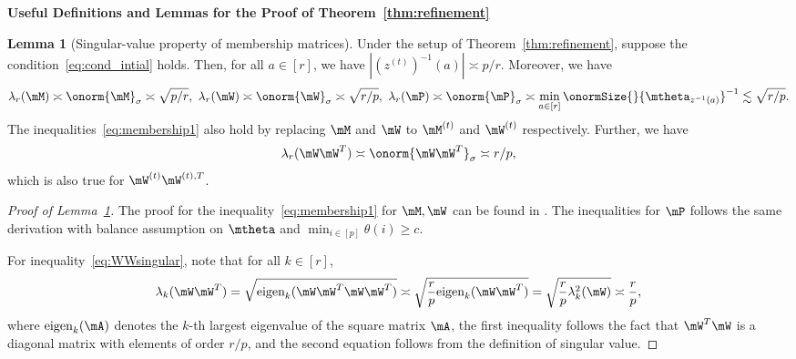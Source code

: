 \documentclass[lettersize,onecolumn,journal]{IEEEtran}
\theoremstyle{definition}
\newtheorem{lem}{Lemma}
\theoremstyle{definition}
\newcommand{\of}[1]{\left(#1\right)}
\begin{document}
{\bf Useful Definitions and Lemmas for the Proof of Theorem~\ref{thm:refinement}} 






\begin{lem}[Singular-value property of membership matrices]\label{lem:membership} Under the setup of Theorem~\ref{thm:refinement}, suppose the condition~\eqref{eq:cond_intial} holds. Then, for all $a \in [r]$, we have $|\of{z^{(t)}}^{-1}(a)| \asymp p/r$. Moreover, we have 
\begin{equation}\label{eq:membership1}
    \lambda_{r}(\mM) \asymp \onorm{\mM}_{\sigma} \asymp \sqrt{p/r}, \   \lambda_{r}(\mW) \asymp \onorm{\mW}_{\sigma} \asymp \sqrt{r/p},\   \lambda_{r}(\mP) \asymp \onorm{\mP}_{\sigma}    \asymp  \min_{a \in [r] } \onormSize{}{\mtheta_{z^{-1}(a)}}^{-1}  \lesssim  \sqrt{r/p} .
\end{equation}
The inequalities~\eqref{eq:membership1} also hold by replacing $\mM$ and $\mW$ to $\mM^{(t)}$ and $\mW^{(t)}$ respectively. 
Further, we have 
\begin{equation}\label{eq:WWsingular}
   \lambda_{r}(\mW\mW^T) \asymp \onorm{\mW\mW^T}_{\sigma} \asymp r/p,
\end{equation}
which is also true for $\mW^{(t)}\mW^{(t),T}$.
\end{lem}

\begin{proof}[Proof of Lemma~\ref{lem:membership}] The proof for the inequality~\eqref{eq:membership1} for $\mM, \mW$ can be found in \citet[Proof of Lemma 4]{han2020exact}. The inequalities for $\mP$ follows the same derivation with balance assumption on $\mtheta$ and $\min_{i \in [p]}\theta(i) \geq c$.

For inequality~\eqref{eq:WWsingular}, note that for all $k \in [r]$,
\begin{align}
    \lambda_k(\mW\mW^T) = \sqrt{\text{eigen}_k (\mW \mW^T\mW\mW^T)} \asymp \sqrt{\frac{r}{p} \text{eigen}_k (\mW \mW^T)} = \sqrt{\frac{r}{p} \lambda^2_k(\mW)} \asymp \frac{r}{p},
\end{align}
where $\text{eigen}_k(\mA)$ denotes the $k$-th largest eigenvalue of the square matrix $\mA$, the first inequality follows the fact that $\mW^T\mW$ is a diagonal matrix with elements of order $r/p$, and the second equation follows from the definition of singular value.
\end{proof}
\end{document}
